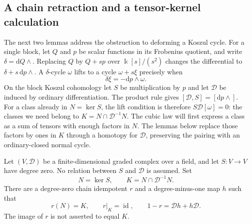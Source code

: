 \subsection{A chain retraction and a tensor-kernel calculation}
\label{frob:linear-subsection}

The next two lemmas address the obstruction to deforming a Koszul
cycle. For a single block, let $Q$ and $p$ be scalar functions in its
Frobenius quotient, and write $\delta=\mathrm dQ\wedge{}$.
Replacing $Q$ by $Q+sp$ over $\Bbbk[s]/(s^2)$ changes the differential
to $\delta+s\,\mathrm dp\wedge{}$. A $\delta$-cycle $\omega$ lifts to
a cycle $\omega+s\xi$ precisely when
\[
                    \delta\xi=-\mathrm dp\wedge\omega.
\]
On the block Koszul cohomology let $S$ be multiplication by $p$ and
let $\mathcal D$ be induced by ordinary differentiation. The product
rule gives $[\mathcal D,S]=[\mathrm dp\wedge{}]$. For a class already
in $N=\ker S$, the lift condition is therefore
$S\mathcal D[\omega]=0$: the classes we need belong to
$K=N\cap\mathcal D^{-1}N$. The cubic law will first express a class
as a sum of tensors with enough factors in $N$. The lemmas below
replace those factors by ones in $K$ through a homotopy for
$\mathcal D$, preserving the pairing with an ordinary-closed normal
cycle.

\begin{lemma}
\label{frob:retraction}
Let $(V,\mathcal D)$ be a finite-dimensional graded complex over a
field, and let $S:V\to V$ have degree zero.  No relation between $S$
and $\mathcal D$ is assumed.  Set
\[
 N=\ker S,\qquad K=N\cap\mathcal D^{-1}N.
\]
There are a degree-zero chain idempotent $r$ and a degree-minus-one
map $h$ such that
\begin{equation}
 r(N)=K,\qquad r|_K=\operatorname{id},\qquad
                  1-r=\mathcal Dh+h\mathcal D.
 \label{frob:retraction-identity}
\end{equation}
The image of $r$ is not asserted to equal $K$.
\end{lemma}

